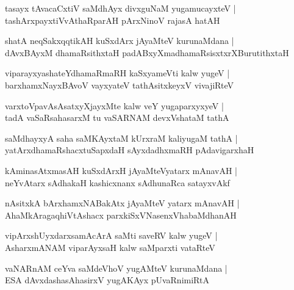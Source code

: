 \begin{shloka}
tasayx tAvacaCxtiV saMdhAyx divxguNaM yugamucayxteV |\\
tashArxpayxtiVvAthaRparAH pArxNinoV rajasA hatAH 
\end{shloka}

\begin{shloka}
shatA neqSakxqqtikAH kuSxdArx jAyaMteV kurunaMdana |\\
dAvxBAyxM dhamaRsithxtaH padABxyXmadhamaRsisx{}txrXBurutithxtaH 
\end{shloka}

\begin{shloka}
viparayxyashateYdhamaRmaRH kaSxyameVti kalw yugeV |\\
barxhamxNayxBAvoV vayxyateV tathAsitxkeyxV vivajiRteV 
\end{shloka}

\begin{shloka}
varxtoVpavAsAsatxyXjayxMte kalw veY yugaparxyxyeV |\\
tadA vaSaRsahasarxM tu vaSARNAM devxVshataM tathA
\end{shloka}

\begin{shloka}
saMdhayxyA saha saMKAyxtaM kUrxraM kaliyugaM tathA |\\
yatArxdhamaRshacxtuSapxdaH sAyxdadhxmaRH pAdavigarxhaH 
\end{shloka}

\begin{shloka}
kAminasAtxmasAH kuSxdArxH jAyaMteVyatarx mAnavAH |\\
neYvAtarx sAdhakaH kashicxnanx sAdhunaRca satayxvAkf
\end{shloka}

\begin{shloka}
nAsitxkA bArxhamxNABakAtx jAyaMteV yatarx mAnavAH |\\
AhaMkAragaqhiVtAshacx parxkiSxVNasenxVhabaMdhanAH 
\end{shloka}

\begin{shloka}
vipArxshUyxdarxsamAcArA saMti saveRV kalw yugeV |\\
AsharxmANAM viparAyxsaH kalw saMparxti vataRteV 
\end{shloka}

\begin{shloka}
vaNARnAM ceYva saMdeVhoV yugAMteV kurunaMdana |\\
ESA dAvxdashasAhasirxV yugAKAyx pUvaRnimiRtA 
\end{shloka}

